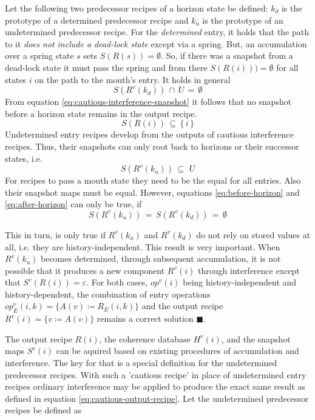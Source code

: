 \documentclass[12pt,a4paper]{scrartcl}
\begin{document}
Let the following two predecessor recipes of a horizon state be defined:
$k_d$ is the prototype of a determined predecessor recipe and $k_u$ is the
prototype of an undetermined predecessor recipe. For the \textit{determined}
entry, it holds that the path to it \textit{does not include a dead-lock state}
except via a spring. But, an accumulation over a spring state $s$ sets
$S(R(s))=\emptyset$. So, if there was a snapshot from a dead-lock state it must
pass the spring and from there $S(R(i)))=\emptyset$ for all states $i$ on the
path to the mouth's entry. It holds in general
\begin{equation} \label{eq:before-horizon}
        S(R^v(k_d))\,\cap\,U\,=\,\emptyset
\end{equation}
From equation \eqref{eq:cautious-interference-snapshot} it follows that no
snapshot before a horizon state remains in the output recipe.
\begin{equation}
        S(R(i))\,\subseteq\,\{\,i\,\}
\end{equation}
Undetermined entry recipes develop from the outputs of cautious interference 
recipes. Thus, their snapshots can only root back to horizons or their successor
states, i.e.
\begin{equation} \label{eq:after-horizon}
        S(R^v(k_u))\,\subseteq\,\,U
\end{equation}
For recipes to pass a mouth state they need to be the equal for all entries. Also
their snapshot maps must be equal. However, equations
\eqref{eq:before-horizon} and \eqref{eq:after-horizon} can only be true, if
\begin{equation} \label{eq:coherence-condition}
    S(R^v(k_u))\,=\,S(R^v(k_d))\,=\,\emptyset 
\end{equation}

This in turn, is only true if $R^v(k_u)$ and $R^v(k_d)$ do not rely on stored
values at all, i.e. they are history-independent. This result is very important. When
$R^v(k_u)$ becomes determined, through subsequent accumulation, it is not
possible that it produces a new component $R^v(i)$ through interference except
that $S^v(R(i))=\varepsilon$.  For both cases, $op^v(i)$ being history-independent and
history-dependent, the combination of entry operations $op^v_E(i,k) = \{ A(v)
\coloneqq R_E(i,k) \}$ and the output recipe $R^v(i)=\{ v\coloneqq A(v) \}$
remains a correct solution $\blacksquare$.  

The output recipe $R(i)$, the coherence database $H^v(i)$, and the snapshot
maps $S^v(i)$ can be aquired based on existing procedures of accumulation and
interference. The key for that is a special definition for the undetermined
predecessor recipes. With such a 'cautious recipe' in place of undetermined
entry recipes ordinary interference may be applied to produce the exact same
result as defined in equation \eqref{eq:cautious-output-recipe}.  Let the
undetermined predecessor recipes be defined as
\end{document}
